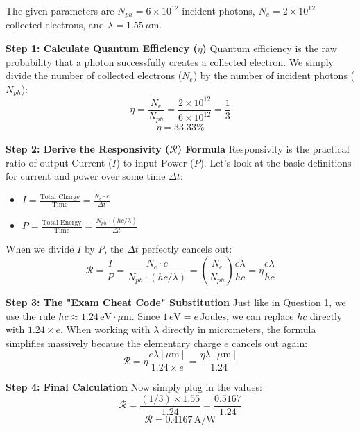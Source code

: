 The given parameters are $N_{ph} = 6\times10^{12}$ incident photons, $N_e = 2\times10^{12}$ collected electrons, and $\lambda = 1.55\,\mu\text{m}$.

\textbf{Step 1: Calculate Quantum Efficiency ($\eta$)}
Quantum efficiency is the raw probability that a photon successfully creates a collected electron. We simply divide the number of collected electrons ($N_e$) by the number of incident photons ($N_{ph}$):
\begin{equation*}
  \eta = \frac{N_e}{N_{ph}} = \frac{2 \times 10^{12}}{6 \times 10^{12}} = \frac{1}{3}
\end{equation*}
\begin{equation*}
  \boxed{\eta = 33.33\%}
\end{equation*}

\textbf{Step 2: Derive the Responsivity ($\mathcal{R}$) Formula}
Responsivity is the practical ratio of output Current ($I$) to input Power ($P$). Let's look at the basic definitions for current and power over some time $\Delta t$:
\begin{itemize}
  \item $I = \frac{\text{Total Charge}}{\text{Time}} = \frac{N_e \cdot e}{\Delta t}$
  \item $P = \frac{\text{Total Energy}}{\text{Time}} = \frac{N_{ph} \cdot (hc/\lambda)}{\Delta t}$
\end{itemize}
When we divide $I$ by $P$, the $\Delta t$ perfectly cancels out:
\begin{equation*}
  \mathcal{R} = \frac{I}{P} = \frac{N_e \cdot e}{N_{ph} \cdot (hc/\lambda)} = \left(\frac{N_e}{N_{ph}}\right) \frac{e\lambda}{hc} = \eta \frac{e\lambda}{hc}
\end{equation*}

\textbf{Step 3: The "Exam Cheat Code" Substitution}
Just like in Question 1, we use the rule $hc \approx 1.24\,\text{eV}\cdot\mu\text{m}$. Since $1\,\text{eV} = e\,\text{Joules}$, we can replace $hc$ directly with $1.24 \times e$. When working with $\lambda$ directly in micrometers, the formula simplifies massively because the elementary charge $e$ cancels out again:
\begin{equation*}
  \mathcal{R} = \eta \frac{e \lambda[\mu\text{m}]}{1.24 \times e} = \frac{\eta \lambda[\mu\text{m}]}{1.24}
\end{equation*}

\textbf{Step 4: Final Calculation}
Now simply plug in the values:
\begin{equation*}
  \mathcal{R} = \frac{(1/3) \times 1.55}{1.24} = \frac{0.5167}{1.24}
\end{equation*}
\begin{equation*}
  \boxed{\mathcal{R} = 0.4167\,\text{A/W}}
\end{equation*}

